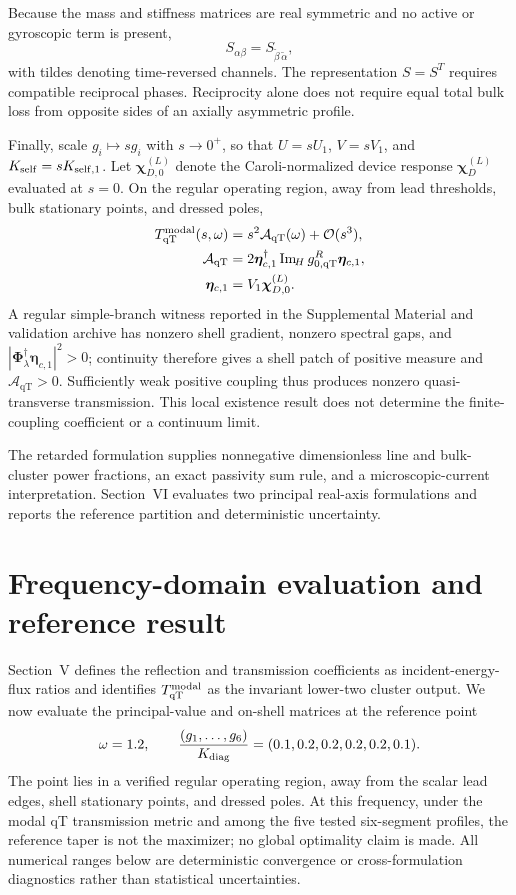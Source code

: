 \documentclass[10pt,aps,pre,reprint,floatfix,notitlepage,nofootinbib]{revtex4-2}
\newcommand{\vchi}{\bm{\chi}}
\newcommand{\veta}{\bm{\eta}}
\newcommand{\order}{\mathcal O}
\newcommand{\qT}{\mathrm{qT}}
\newcommand{\ImH}{\operatorname{Im}_{\!H}}
\begin{document}
Because the mass and stiffness matrices are real symmetric and no active or gyroscopic term is present,
\begin{equation}
 S_{\alpha\beta}=S_{\widetilde\beta\,\widetilde\alpha},
 \label{eq:reciprocity}
\end{equation}
with tildes denoting time-reversed channels.  The representation $S=S^T$ requires compatible reciprocal phases.  Reciprocity alone does not require equal total bulk loss from opposite sides of an axially asymmetric profile.

Finally, scale $g_i\mapsto s g_i$ with $s\to0^+$, so that $U=sU_1$, $V=sV_1$, and $K_{\rm self}=sK_{{\rm self},1}$.  Let $\vchi_{D,0}^{(L)}$ denote the Caroli-normalized device response $\vchi_D^{(L)}$ evaluated at $s=0$.  On the regular operating region, away from lead thresholds, bulk stationary points, and dressed poles,
\begin{align}
 T_{\qT}^{\rm modal}(s,\omega)
 &=s^2\mathcal A_{\qT}(\omega)+\order(s^3),\\
 \mathcal A_{\qT}
 &=2\veta_{c,1}^\dagger\ImH g_{0,\qT}^R\veta_{c,1},\\
 \veta_{c,1}&=V_1\vchi_{D,0}^{(L)}.
 \label{eq:weak}
\end{align}
A regular simple-branch witness reported in the Supplemental Material and validation archive has nonzero shell gradient, nonzero spectral gaps, and $|\bm\Phi_\lambda^\dagger\veta_{c,1}|^2>0$; continuity therefore gives a shell patch of positive measure and $\mathcal A_{\qT}>0$.  Sufficiently weak positive coupling thus produces nonzero quasi-transverse transmission.  This local existence result does not determine the finite-coupling coefficient or a continuum limit.

The retarded formulation supplies nonnegative dimensionless line and bulk-cluster power fractions, an exact passivity sum rule, and a microscopic-current interpretation.  Section~VI evaluates two principal real-axis formulations and reports the reference partition and deterministic uncertainty.

\section{Frequency-domain evaluation and reference result}
\label{sec:s6-frequency}

Section~V defines the reflection and transmission coefficients as incident-energy-flux ratios and identifies $T_{\qT}^{\rm modal}$ as the invariant lower-two cluster output.  We now evaluate the principal-value and on-shell matrices at the reference point
\begin{equation}
 \omega=1.2,
 \qquad
 \frac{(g_1,\ldots,g_6)}{K_{\rm diag}}
 =(0.1,0.2,0.2,0.2,0.2,0.1).
 \label{eq:s6-reference-point}
\end{equation}
The point lies in a verified regular operating region, away from the scalar lead edges, shell stationary points, and dressed poles.  At this frequency, under the modal qT transmission metric and among the five tested six-segment profiles, the reference taper is not the maximizer; no global optimality claim is made.  All numerical ranges below are deterministic convergence or cross-formulation diagnostics rather than statistical uncertainties.
\end{document}

